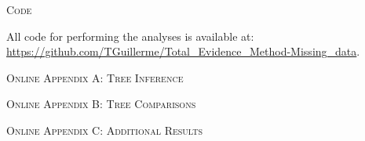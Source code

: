 \documentclass[12pt,letterpaper]{article}
\renewcommand{\section}[1]{%
\bigskip
\begin{center}
\begin{Large}
\normalfont\scshape #1
\medskip
\end{Large}
\end{center}}
\begin{document}
\section{Code}
All code for performing the analyses is available at: \url{https://github.com/TGuillerme/Total_Evidence_Method-Missing_data}.

\newpage
\section{Online Appendix A: Tree Inference}
  
  \label{Supp_TreeBuilding}

\newpage
\section{Online Appendix B: Tree Comparisons}
  
  \label{Supp_TreeComparison}




\newpage
\section{Online Appendix C: Additional Results}
  
  \label{Supp_results}

\end{document}
